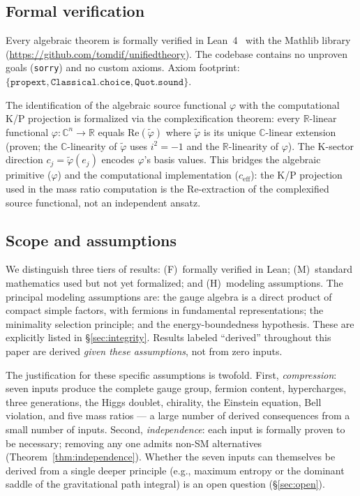 \documentclass[12pt,a4paper]{article}
\begin{document}
\subsection{Formal verification}
\label{sec:formal_verification}

Every algebraic theorem is formally verified in Lean~4~\cite{lean4} with the Mathlib library (\url{https://github.com/tomdif/unifiedtheory}). The codebase contains no unproven goals (\texttt{sorry}) and no custom axioms. Axiom footprint: $\{\texttt{propext}, \texttt{Classical.choice}, \texttt{Quot.sound}\}$.

The identification of the algebraic source functional $\varphi$ with the computational K/P projection is formalized via the complexification theorem: every $\mathbb{R}$-linear functional $\varphi: \mathbb{C}^n \to \mathbb{R}$ equals $\mathrm{Re}(\tilde\varphi)$ where $\tilde\varphi$ is its unique $\mathbb{C}$-linear extension (proven; the $\mathbb{C}$-linearity of $\tilde\varphi$ uses $i^2 = -1$ and the $\mathbb{R}$-linearity of $\varphi$).  The K-sector direction $c_j = \tilde\varphi(e_j)$ encodes $\varphi$'s basis values.  This bridges the algebraic primitive ($\varphi$) and the computational implementation ($c_{\mathrm{eff}}$): the K/P projection used in the mass ratio computation is the $\mathrm{Re}$-extraction of the complexified source functional, not an independent ansatz.

\subsection{Scope and assumptions}

We distinguish three tiers of results: (F)~formally verified in Lean; (M)~standard mathematics used but not yet formalized; and (H)~modeling assumptions. The principal modeling assumptions are: the gauge algebra is a direct product of compact simple factors, with fermions in fundamental representations; the minimality selection principle; and the energy-boundedness hypothesis. These are explicitly listed in \S\ref{sec:integrity}. Results labeled ``derived'' throughout this paper are derived \emph{given these assumptions}, not from zero inputs.

The justification for these specific assumptions is twofold.  First, \emph{compression}: seven inputs produce the complete gauge group, fermion content, hypercharges, three generations, the Higgs doublet, chirality, the Einstein equation, Bell violation, and five mass ratios --- a large number of derived consequences from a small number of inputs.  Second, \emph{independence}: each input is formally proven to be necessary; removing any one admits non-SM alternatives (Theorem~\ref{thm:independence}).  Whether the seven inputs can themselves be derived from a single deeper principle (e.g., maximum entropy or the dominant saddle of the gravitational path integral) is an open question (\S\ref{sec:open}).
\end{document}
